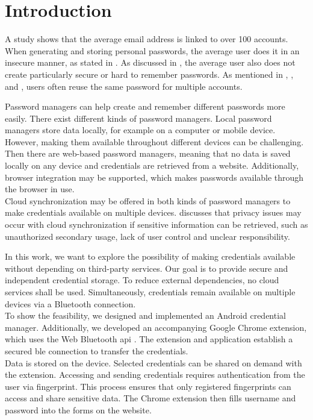 \section{Introduction} \label{introduction}
A study \cite{DigitalGuardian} shows that the average email address is linked to over 100 accounts.
When generating and storing personal passwords, the average user does it in an insecure manner, as stated in \cite{pilar2012passwords}. As discussed in \cite{AdamsS99}, the average user also does not create particularly secure or hard to remember passwords. As mentioned in \cite{AdamsS99}, \cite{pilar2012passwords}, and \cite{Statista}, users often reuse the same password for multiple accounts.

Password managers can help create and remember different passwords more easily. There exist different kinds of password managers. Local password managers store data locally, for example on a computer or mobile device. However, making them available throughout different devices can be challenging. \\
Then there are web-based password managers, meaning that no data is saved locally on any device and credentials are retrieved from a website. Additionally, browser integration may be supported, which makes passwords available through the browser in use. \\
Cloud synchronization may be offered in both kinds of password managers to make credentials available on multiple devices. \cite{SainiM14} discusses that privacy issues may occur with cloud synchronization if sensitive information can be retrieved, such as unauthorized secondary usage, lack of user control and unclear responsibility.

In this work, we want to explore the possibility of making credentials available without depending on third-party services. Our goal is to provide secure and independent credential storage. To reduce external dependencies, no cloud services shall be used. Simultaneously, credentials remain available on multiple devices via a Bluetooth connection. \\
To show the feasibility, we designed and implemented an Android credential manager. Additionally, we developed an accompanying Google Chrome extension, which uses the Web Bluetooth \gls{api} \cite{WebBTAPI}. The extension and application establish a secured \gls{ble} connection to transfer the credentials. \\
Data is stored on the device. Selected credentials can be shared on demand with the extension. Accessing and sending credentials requires authentication from the user via fingerprint. This process ensures that only registered fingerprints can access and share sensitive data. 
The Chrome extension then fills username and password into the forms on the website. \\

